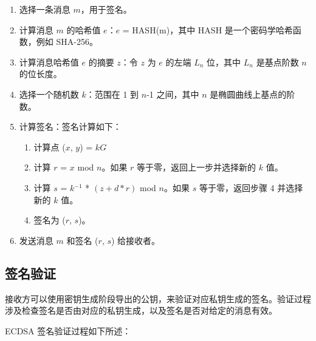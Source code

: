 \documentclass[main\_\_CN.tex]{subfiles}
\begin{document}
\begin{enumerate}
    \item 选择一条消息 $m$，用于签名。
    \item 计算消息 $m$ 的哈希值 $e$：$e$ = HASH(m)，其中 HASH 是一个密码学哈希函数，例如 SHA-256。
    \item 计算消息哈希值 $e$ 的摘要 $z$：令 $z$ 为 $e$ 的左端 $L_n$ 位，其中 $L_n$ 是基点阶数 $n$ 的位长度。
    \item 选择一个随机数 $k$：范围在 1 到 $n$-1 之间，其中 $n$ 是椭圆曲线上基点的阶数。
    \item 计算签名：签名计算如下：
          \begin{enumerate}
              \item 计算点 ($x$, $y$) = $kG$
              \item 计算 $r$ = $x$ \textrm{mod} $n$。如果 $r$ 等于零，返回上一步并选择新的 $k$ 值。
              \item 计算 $s$ = $k$$^{-1}$ * $(z + d*r)$ \textrm{mod} $n$。如果 $s$ 等于零，返回步骤 4 并选择新的 $k$ 值。
              \item 签名为 ($r$, $s$)。
          \end{enumerate}
    \item 发送消息 $m$ 和签名 ($r$, $s$) 给接收者。
\end{enumerate}

\subsection{签名验证}

接收方可以使用密钥生成阶段导出的公钥，来验证对应私钥生成的签名。验证过程涉及检查签名是否由对应的私钥生成，以及签名是否对给定的消息有效。

ECDSA 签名验证过程如下所述：
\end{document}
